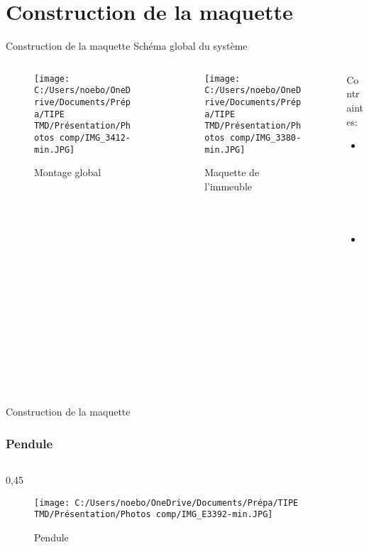 \documentclass{beamer}
\begin{document}
	\section{Construction de la maquette}
	\begin{frame}{Construction de la maquette}
		Schéma global du système
		\begin{columns}
			\begin{column}{0.3\textwidth}
				\begin{figure}
					\texttt{[image: C:/Users/noebo/OneDrive/Documents/Prépa/TIPE TMD/Présentation/Photos comp/IMG\_3412-min.JPG]}
					\caption{Montage global}
				\end{figure}
			\end{column}
			\begin{column}{0.3\textwidth}
			
			\begin{figure}
				\texttt{[image: C:/Users/noebo/OneDrive/Documents/Prépa/TIPE TMD/Présentation/Photos comp/IMG\_3380-min.JPG]}
				\caption{Maquette de l'immeuble}
			\end{figure}
			\end{column}
	
		\begin{column}{0.2\textwidth}
				Contraintes:
		\begin{itemize}
			\item Taille
			\item Flexibilité \\
		\end{itemize}
		\end{column}
	\end{columns}
	\end{frame}

	
	\begin{frame}{Construction de la maquette}
		\frametitle{Pendule}
		\begin{columns}
			\begin{column}{0,45\textwidth}
				\begin{figure}
					\texttt{[image: C:/Users/noebo/OneDrive/Documents/Prépa/TIPE TMD/Présentation/Photos comp/IMG\_E3392-min.JPG]}
					\caption{Pendule}
				\end{figure}
			\end{column}
		\end{columns}

	\end{frame}
\end{document}

